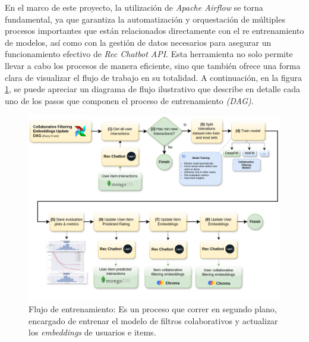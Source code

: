 \documentclass[11pt,a4paper,twoside]{thesis}
\begin{document}
En el marco de este proyecto, la utilización de \textit{Apache Airflow} se torna fundamental, ya que garantiza la automatización y orquestación de múltiples procesos importantes que están relacionados directamente con el re entrenamiento de modelos, así como con la gestión de datos necesarios para asegurar un funcionamiento efectivo de \textit{Rec Chatbot API}. Esta herramienta no solo permite llevar a cabo los procesos de manera eficiente, sino que también ofrece una forma clara de visualizar el flujo de trabajo en su totalidad. A continuación, en la figura \ref{fig:training-flow}, se puede apreciar un diagrama de flujo ilustrativo que describe en detalle cada uno de los pasos que componen el proceso de entrenamiento \textit{(DAG)}.

\begin{figure}[H]
	\centering
	\label{fig:training-flow}
	\includegraphics[width=12cm]{./images/training.flow.png}
	\caption{Flujo de entrenamiento: Es un proceso que correr en segundo plano, encargado de entrenar el modelo de filtros colaborativos y actualizar los \textit{embeddings} de usuarios e items.}
\end{figure}
\end{document}
